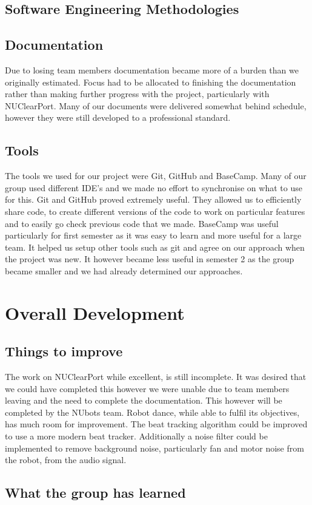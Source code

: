 \documentclass[english,12pt]{scrartcl}
\begin{document}
	\subsection{Software Engineering Methodologies}
		
	\subsection{Documentation}
		Due to losing team members documentation became more of a burden than we originally estimated.
		Focus had to be allocated to finishing the documentation rather than making further progress with the project, particularly with NUClearPort.
		Many of our documents were delivered somewhat behind schedule, however they were still developed to a professional standard.
	
	\subsection{Tools}
		The tools we used for our project were Git, GitHub and BaseCamp.
		Many of our group used different IDE's and we made no effort to synchronise on what to use for this.
		Git and GitHub proved extremely useful.
		They allowed us to efficiently share code, to create different versions of the code to work on particular features and to easily go check previous code that we made.
		BaseCamp was useful particularly for first semester as it was easy to learn and more useful for a large team. It helped us setup other tools such as git and agree on our approach when the project was new.
		It however became less useful in semester 2 as the group became smaller and we had already determined our approaches.
\section{Overall Development}
	\subsection{Things to improve}
		The work on NUClearPort while excellent, is still incomplete.
		It was desired that we could have completed this however we were unable due to team members leaving and the need to complete the documentation.
		This however will be completed by the NUbots team.
		Robot dance, while able to fulfil its objectives, has much room for improvement.
		The beat tracking algorithm could be improved to use a more modern beat tracker.
		Additionally a noise filter could be implemented to remove background noise, particularly fan and motor noise from the robot, from the audio signal.
	
	\subsection{What the group has learned}
	
\end{document}
